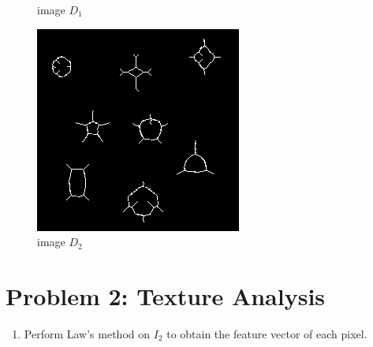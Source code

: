 \documentclass[12pt,a4paper,notitlepage,oneside,amsmath,amssymb]{article}
\begin{document}
\begin{CJK*}{UTF8}{bkai}
\begin{enumerate}[label=(\alph*)]
\begin{figure}[hbt!]
\begin{minipage}{.3\textwidth}
			      \caption*{image \(D_1\)}
		      \end{minipage}%
		      \begin{minipage}{.3\textwidth}
			      \centering
			      \includegraphics[width=.9\linewidth]{image_D2}
			      \caption*{image \(D_2\)}
		      \end{minipage}
	      \end{figure}

\end{enumerate}

\newpage

\section*{Problem 2: Texture Analysis}
\begin{enumerate}[label=(\alph*)]
\item Perform Law’s method on \(I_2\) to obtain the feature vector of each pixel.


\end{enumerate}
\end{CJK*}
\end{document}
